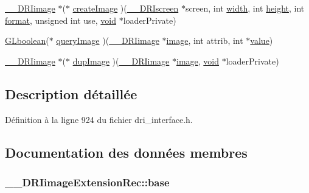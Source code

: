 \begin{DoxyCompactItemize}
\item 
\hyperlink{dri__interface_8h_a37e0407153595dc88fe5d25127645cf1}{\-\_\-\-\_\-\-D\-R\-Iimage} $\ast$($\ast$ \hyperlink{struct_____d_r_iimage_extension_rec_abe2e5f52994ae516b3d83ca5e3dfaa25}{create\-Image} )(\hyperlink{dri__interface_8h_a9961b01d421ee1fd6ed3c05acc9ca561}{\-\_\-\-\_\-\-D\-R\-Iscreen} $\ast$screen, int \hyperlink{gl_8h_a30a197eaed803ac3cd1b444d4c972354}{width}, int \hyperlink{gl_8h_aab021b2df174b06135ca6744356dcf34}{height}, int \hyperlink{gl_8h_a623c5b7577f9ec4174db688b61b73be7}{format}, unsigned int use, \hyperlink{glu_8h_a4292190e3f1f6b373a760c7d9316ad3c}{void} $\ast$loader\-Private)
\item 
\hyperlink{gl_8h_aea1419aa8aec5854bd9807b45171029d}{G\-Lboolean}($\ast$ \hyperlink{struct_____d_r_iimage_extension_rec_affe29b8a48fe33406f6a5a971e47ffef}{query\-Image} )(\hyperlink{dri__interface_8h_a37e0407153595dc88fe5d25127645cf1}{\-\_\-\-\_\-\-D\-R\-Iimage} $\ast$\hyperlink{gl_8h_a4f252db605f5b9117603096756e79824}{image}, int attrib, int $\ast$\hyperlink{glext_8h_a79169be77d7e02a24f68a5bfe627dc29}{value})
\item 
\hyperlink{dri__interface_8h_a37e0407153595dc88fe5d25127645cf1}{\-\_\-\-\_\-\-D\-R\-Iimage} $\ast$($\ast$ \hyperlink{struct_____d_r_iimage_extension_rec_aeb494b3de5da389667aafbb419a042db}{dup\-Image} )(\hyperlink{dri__interface_8h_a37e0407153595dc88fe5d25127645cf1}{\-\_\-\-\_\-\-D\-R\-Iimage} $\ast$\hyperlink{gl_8h_a4f252db605f5b9117603096756e79824}{image}, \hyperlink{glu_8h_a4292190e3f1f6b373a760c7d9316ad3c}{void} $\ast$loader\-Private)
\end{DoxyCompactItemize}


\subsection{Description détaillée}


Définition à la ligne 924 du fichier dri\-\_\-interface.\-h.



\subsection{Documentation des données membres}
\hypertarget{struct_____d_r_iimage_extension_rec_a0705eddcc3909eb2c216213a4ba74040}{
\subsubsection[{base}]{ \-\_\-\-\_\-\-D\-R\-Iimage\-Extension\-Rec\-::base}}\label{struct_____d_r_iimage_extension_rec_a0705eddcc3909eb2c216213a4ba74040}


